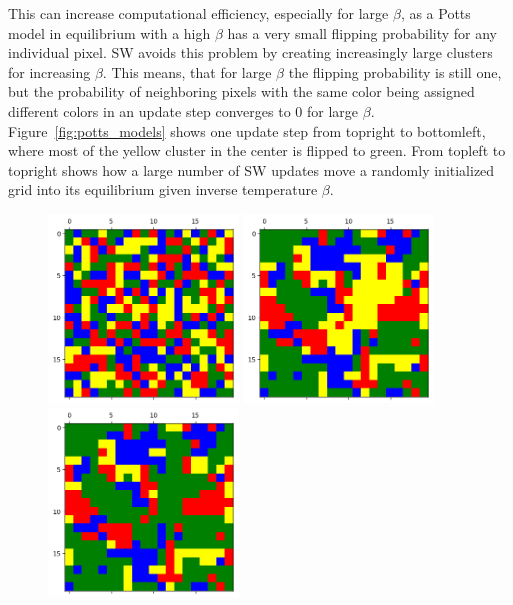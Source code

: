 \documentclass[12pt, twoside]{article}
\newcommand{\1}{\mathbb{1}}
\begin{document}
This can increase computational efficiency, especially for large $\beta$, as a Potts model in equilibrium with a high $\beta$ has a very small flipping probability for any individual pixel. SW avoids this problem by creating increasingly large clusters for increasing $\beta$. This means, that for large $\beta$ the flipping probability is still one, but the probability of neighboring pixels with the same color being assigned different colors in an update step converges to 0 for large $\beta$.
Figure~\ref{fig:potts_models} shows one update step from topright to bottomleft, where most of the yellow cluster in the center is flipped to green. From topleft to topright shows how a large number of SW updates move a randomly initialized grid into its equilibrium given inverse temperature $\beta$.
%
\begin{figure}
	\centering
	\includegraphics[width=0.45\textwidth]{plots/grid_initial.png}
	\includegraphics[width=0.45\textwidth]{plots/grid_b1_it401.png}
	\includegraphics[width=0.45\textwidth]{plots/grid_b1_it402.png}

\end{figure}
\end{document}
